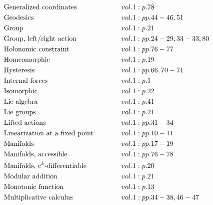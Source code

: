 \documentclass[a4paper]{article}
\begin{document}
\begin{align*}
&\text{Generalized coordinates} \hspace*{3em}&& vol. 1: p. 78\\
&\text{Geodesics} \hspace*{3em}&& vol. 1: pp. 44-46, 51\\
&\text{Group} \hspace*{3em}&& vol. 1: p. 21\\
&\text{Group, left/right action} \hspace*{3em}&& vol. 1: pp. 24-29, 33-33, 80\\
&\text{Holonomic constraint} \hspace*{3em}&& vol. 1: pp. 76-77\\
&\text{Homeomorphic} \hspace*{3em}&& vol. 1: p. 19\\
&\text{Hysteresis} \hspace*{3em}&& vol. 1: pp. 66, 70-71\\
&\text{Internal forces} \hspace*{3em}&& vol. 1: p. 1\\
&\text{Isomorphic} \hspace*{3em}&& vol. 1: p. 22\\
&\text{Lie algebra} \hspace*{3em}&& vol. 1: p. 41\\
&\text{Lie groups} \hspace*{3em}&& vol. 1: p. 21\\
&\text{Lifted actions} \hspace*{3em}&& vol. 1: pp. 31-34\\
&\text{Linearization at a fixed point} \hspace*{3em}&& vol. 1: pp. 10-11\\
&\text{Manifolds} \hspace*{3em}&& vol. 1: pp. 17-19\\
&\text{Manifolds, accessible} \hspace*{3em}&& vol. 1: pp. 76-78\\
&\text{Manifolds, c$^k$-differentiable} \hspace*{3em}&& vol. 1: p. 20\\
&\text{Modular addition} \hspace*{3em}&& vol. 1: p. 21\\
&\text{Monotonic function} \hspace*{3em}&& vol. 1: p. 13\\
&\text{Multiplicative calculus} \hspace*{3em}&& vol. 1: pp. 34-38, 46-47\\

\end{align*}
\end{document}
